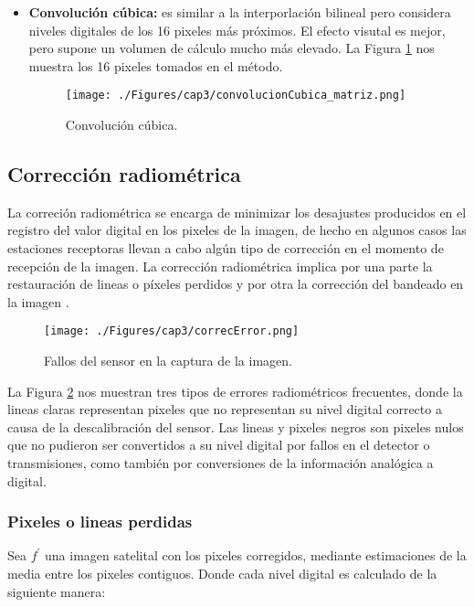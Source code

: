 \begin{itemize}
		    		\item \textbf{Convoluci\'on c\'ubica:} es similar a la interporlaci\'on bilineal pero considera niveles digitales de los 16 pixeles m\'as pr\'oximos. El efecto visutal es mejor, pero supone un volumen de c\'alculo mucho m\'as elevado. La Figura \ref{fig:convCubica2} nos muestra los 16 pixeles tomados en el m\'etodo. 
		    				    \begin{figure}[H]
		    				    	\centering
		    				    	\texttt{[image: ./Figures/cap3/convolucionCubica\_matriz.png]}
		    				    	\caption{Convoluci\'on c\'ubica.}
		    				    	\label{fig:convCubica2}
		    				    \end{figure}
	\end{itemize}
\subsection{Correcci\'on radiom\'etrica}
La correci\'on radiom\'etrica se encarga de minimizar los desajustes producidos en el registro del valor digital en los pixeles de la imagen, de hecho en algunos casos las estaciones receptoras llevan a cabo alg\'un tipo de correcci\'on en el momento de recepci\'on de la imagen. La corrección radiom\'etrica implica por una parte la restauraci\'on de lineas o p\'ixeles perdidos y por otra la correcci\'on del bandeado en la imagen \cite{teledUm}.
    \begin{figure}[H]
    	\centering
    	\texttt{[image: ./Figures/cap3/correcError.png]}
    	\caption{Fallos del sensor en la captura de la imagen.}
    	\label{fig:correcError}
    \end{figure}
La Figura \ref{fig:correcError} nos muestran tres tipos de errores radiom\'etricos frecuentes, donde la lineas claras representan pixeles que no representan su nivel digital correcto a causa de la descalibraci\'on del sensor. Las lineas y pixeles negros son pixeles nulos que no pudieron ser convertidos a su nivel digital por fallos en el detector o transmisiones, como tambi\'en por conversiones de la informaci\'on anal\'ogica a digital.

\subsubsection{Pixeles o lineas perdidas}\label{subsec:pixelesP}
Sea $ f^{'} $ una imagen satelital con los pixeles corregidos, mediante estimaciones de la media entre los pixeles contiguos. Donde cada nivel digital es calculado de la siguiente manera: 

